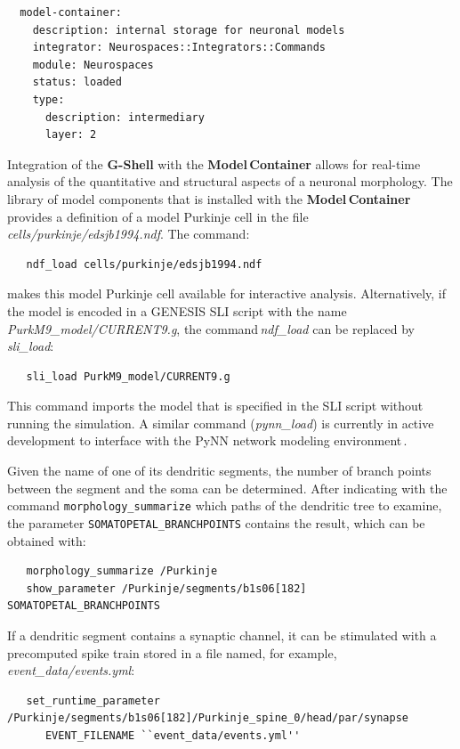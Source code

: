 \documentclass[10pt]{article}
\begin{document}
\begin{verbatim}
  model-container:
    description: internal storage for neuronal models
    integrator: Neurospaces::Integrators::Commands
    module: Neurospaces
    status: loaded
    type:
      description: intermediary
      layer: 2
\end{verbatim}

Integration of the {\bf G-Shell} with the {\bf Model\,Container}
allows for real-time analysis of the quantitative and structural
aspects of a neuronal morphology.  The library of model components
that is installed with the {\bf Model\,Container} provides a
definition of a model Purkinje cell in the file\,{\it
  cells/purkinje/edsjb1994.ndf}.  The command:
\begin{verbatim}
   ndf_load cells/purkinje/edsjb1994.ndf
\end{verbatim}
makes this model Purkinje cell available for interactive analysis.
Alternatively, if the model is encoded in a GENESIS SLI script with the
name\,{\it PurkM9\_model/CURRENT9.g}, the command\,{\it ndf\_load} can be
replaced by\,{\it sli\_load}:

\begin{verbatim}
   sli_load PurkM9_model/CURRENT9.g
\end{verbatim}

This command imports the model that is specified in the SLI script
without running the simulation.  A similar command ({\it pynn\_load})
is currently in active development to interface with the PyNN network modeling
environment\,\cite{davison08:_pynn}.

Given the name of one of its dendritic segments, the number of branch
points between the segment and the soma can be determined. After
indicating with the command {\tt morphology\_summarize} which paths of the dendritic tree to examine, the
parameter {\tt SOMATOPETAL\_BRANCHPOINTS} contains the result, which
can be obtained with:

\begin{verbatim}
   morphology_summarize /Purkinje
   show_parameter /Purkinje/segments/b1s06[182] SOMATOPETAL_BRANCHPOINTS
\end{verbatim}

If a dendritic segment contains a synaptic channel, it can be
stimulated with a precomputed spike train stored in a file named, for
example,\,{\it event\_data/events.yml}:

\begin{verbatim}
   set_runtime_parameter /Purkinje/segments/b1s06[182]/Purkinje_spine_0/head/par/synapse
      EVENT_FILENAME ``event_data/events.yml''
\end{verbatim}
\end{document}
